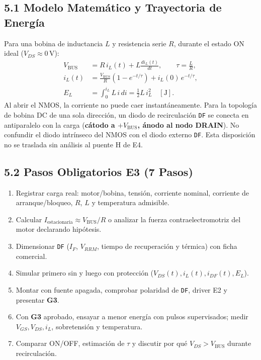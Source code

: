 \documentclass[10pt, a4paper, landscape]{article}
\begin{document}
\begin{minipage}[t]{0.54\linewidth}
\subsection*{5.1 Modelo Matemático y Trayectoria de Energía}
Para una bobina de inductancia $L$ y resistencia serie $R$, durante el estado ON ideal ($V_{DS} \approx 0\,\text{V}$):
\begin{align}
    V_{\text{BUS}} &= R\,i_L(t) + L\frac{di_L(t)}{dt}, \qquad \tau = \frac{L}{R}, \\
    i_L(t) &= \frac{V_{\text{BUS}}}{R}\left(1 - e^{-t/\tau}\right) + i_L(0)\,e^{-t/\tau}, \\
    E_L &= \int_0^{i_L} L\,i\,di = \frac{1}{2}L\,i_L^2 \quad [\text{J}].
\end{align}
Al abrir el NMOS, la corriente no puede caer instantáneamente. Para la topología de bobina DC de una sola dirección, un diodo de recirculación \texttt{DF} se conecta en antiparalelo con la carga (\textbf{cátodo a $+V_{\text{BUS}}$, ánodo al nodo DRAIN}). No confundir el diodo intrínseco del NMOS con el diodo externo \texttt{DF}. Esta disposición no se traslada sin análisis al puente H de E4.

\subsection*{5.2 Pasos Obligatorios E3 (7 Pasos)}
\begin{enumerate}[noitemsep, topsep=2pt]
    \item Registrar carga real: motor/bobina, tensión, corriente nominal, corriente de arranque/bloqueo, $R$, $L$ y temperatura admisible.
    \item Calcular $I_{\text{estacionaria}} \approx V_{\text{BUS}}/R$ o analizar la fuerza contraelectromotriz del motor declarando hipótesis.
    \item Dimensionar \texttt{DF} ($I_F$, $V_{RRM}$, tiempo de recuperación y térmica) con ficha comercial.
    \item Simular primero sin y luego con protección ($V_{DS}(t), i_L(t), i_{DF}(t), E_L$).
    \item Montar con fuente apagada, comprobar polaridad de \texttt{DF}, driver E2 y presentar \textbf{G3}.
    \item Con \textbf{G3} aprobado, ensayar a menor energía con pulsos supervisados; medir $V_{GS}, V_{DS}, i_L$, sobretensión y temperatura.
    \item Comparar ON/OFF, estimación de $\tau$ y discutir por qué $V_{DS} > V_{\text{BUS}}$ durante recirculación.
\end{enumerate}
\end{minipage}\hfill
\end{document}
